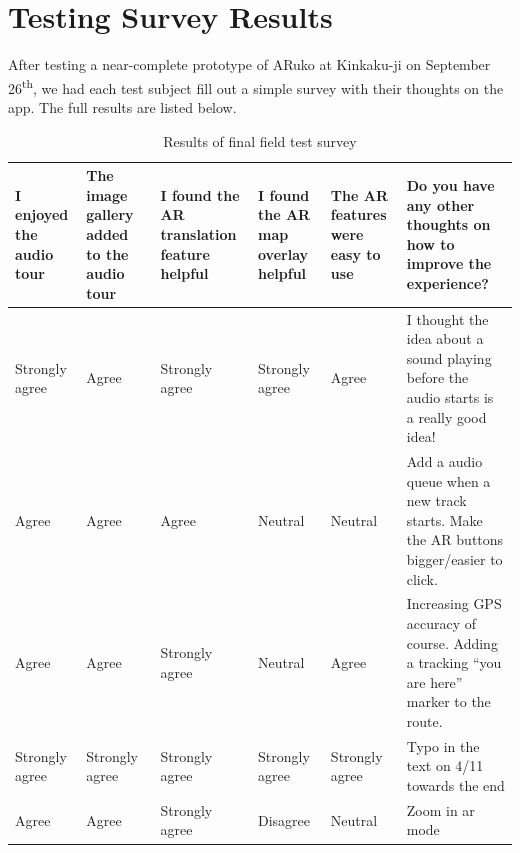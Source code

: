 \documentclass[a4paper, 10pt, american, titlepage]{article}
\begin{document}

\clearpage

\section{Testing Survey Results}
\label{sec:testingSurveyResults}

After testing a near-complete prototype of ARuko at Kinkaku-ji on September
26\textsuperscript{th}, we had each test subject fill out a simple survey with
their thoughts on the app. The full results are listed below.

\begin{table}[h]
\begin{singlespace}
\renewcommand{\arraystretch}{2.0} %
\footnotesize %
\begin{tabulary}{\textwidth}{ L | L | L | L | L | L }
	I enjoyed the audio tour & The image gallery added to the audio tour & I
	found the AR translation feature helpful & I found the AR map overlay
	helpful & The AR features were easy to use & Do you have any other thoughts
	on how to improve the experience? \\
	\hline

	Strongly agree & Agree & Strongly agree & Strongly agree & Agree & I thought
	the idea about a sound playing before the audio starts is a really good
	idea! \\

	Agree & Agree & Agree & Neutral & Neutral & Add a audio queue when a new
	track starts. Make the AR buttons bigger/easier to click. \\

	Agree & Agree & Strongly agree & Neutral & Agree & Increasing GPS accuracy
	of course. Adding a tracking ``you are here'' marker to the route. \\

	Strongly agree & Strongly agree & Strongly agree & Strongly agree & Strongly
	agree & Typo in the text on 4/11 towards the end \\

	Agree & Agree & Strongly agree & Disagree & Neutral & Zoom in ar mode \\
\end{tabulary}
\end{singlespace}
\caption{Results of final field test survey}
\label{tab:testingSurveyResults}
\end{table}
\end{document}
